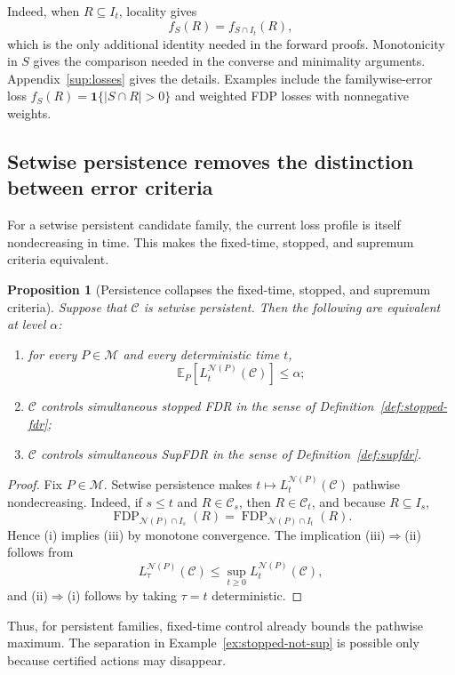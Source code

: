 \documentclass[11pt]{article}
\numberwithin{equation}{section}
\theoremstyle{plain}
\newtheorem{proposition}[theorem]{Proposition}
\theoremstyle{definition}
\newcommand{\E}{\mathbb E}
\newcommand{\M}{\mathcal M}
\newcommand{\C}{\mathcal C}
\newcommand{\FDP}{\operatorname{FDP}}
\newcommand{\calN}{\mathcal N}
\newcommand{\loss}{L}
\newcommand{\one}{\mathbf 1}
\begin{document}
Indeed, when $R\subseteq I_t$, locality gives
\begin{equation}
	f_S(R)=f_{S\cap I_t}(R),
\end{equation}
which is the only additional identity needed in the forward proofs. Monotonicity in $S$ gives the comparison needed in the converse and minimality arguments. Appendix~\ref{sup:losses} gives the details. Examples include the familywise-error loss $f_S(R)=\one\{|S\cap R|>0\}$ and weighted FDP losses with nonnegative weights.

\subsection{Setwise persistence removes the distinction between error criteria}

For a setwise persistent candidate family, the current loss profile is itself nondecreasing in time. This makes the fixed-time, stopped, and supremum criteria equivalent.

\begin{proposition}[Persistence collapses the fixed-time, stopped, and supremum criteria]\label{prop:persistent-fdr-equivalence}
Suppose that $\C$ is setwise persistent. Then the following are equivalent at level $\alpha$:
\begin{enumerate}
\item[(i)] for every $P\in\M$ and every deterministic time $t$,
\[
  \E_P\!\left[\loss_t^{\calN(P)}(\C)\right]\leq\alpha;
\]
\item[(ii)] $\C$ controls simultaneous stopped FDR in the sense of Definition~\ref{def:stopped-fdr};
\item[(iii)] $\C$ controls simultaneous SupFDR in the sense of Definition~\ref{def:supfdr}.
\end{enumerate}
\end{proposition}

\begin{proof}
Fix $P\in\M$. Setwise persistence makes $t\mapsto\loss_t^{\calN(P)}(\C)$ pathwise nondecreasing. Indeed, if $s\leq t$ and $R\in\C_s$, then $R\in\C_t$, and because $R\subseteq I_s$,
\[
  \FDP_{\calN(P)\cap I_s}(R)
  =\FDP_{\calN(P)\cap I_t}(R).
\]
Hence (i) implies (iii) by monotone convergence. The implication (iii)$\Rightarrow$(ii) follows from
\[
  \loss_\tau^{\calN(P)}(\C)
  \leq \sup_{t\geq0}\loss_t^{\calN(P)}(\C),
\]
and (ii)$\Rightarrow$(i) follows by taking $\tau=t$ deterministic.
\end{proof}

Thus, for persistent families, fixed-time control already bounds the pathwise maximum. The separation in Example~\ref{ex:stopped-not-sup} is possible only because certified actions may disappear.
\end{document}
